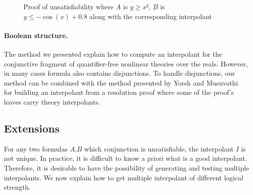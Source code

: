 \begin{example}
\begin{figure}
\caption{Proof of unsatisfiability where $A$ is $y≥x²$, $B$ is $y ≤ -\cos(x) + 0.8$ along with the corresponding interpolant}
\label{fig:proof}
\end{figure}
\end{example}

\paragraph{Boolean structure.}
The method we presented explain how to compute an interpolant for the conjunctive fragment of quantifier-free nonlinear theories over the reals.
However, in many cases formula also contains disjunctions.
To handle disjunctions, our method can be combined with the method presented by Yorsh and Musuvathi~\cite{DBLP:conf/cade/YorshM05} for building an interpolant from a resolution proof where some of the proof's leaves carry theory interpolants.




\subsection{Extensions}

For any two formulas $A$,$B$ which conjunction is unsatisfiable, the interpolant $I$ is not unique.
In practice, it is difficult to know a priori what is a good interpolant.
Therefore, it is desirable to have the possibility of generating and testing multiple interpolants.
We now explain how to get multiple interpolant of different logical strength.

